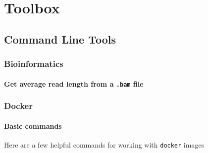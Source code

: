 \documentclass[]{book}
\newenvironment{Shaded}{\begin{snugshade}}{\end{snugshade}}
\newcommand{\ExtensionTok}[1]{#1}
\newcommand{\FunctionTok}[1]{\textcolor[rgb]{0.00,0.00,0.00}{#1}}
\newcommand{\KeywordTok}[1]{\textcolor[rgb]{0.13,0.29,0.53}{\textbf{#1}}}
\newcommand{\NormalTok}[1]{#1}
\newcommand{\StringTok}[1]{\textcolor[rgb]{0.31,0.60,0.02}{#1}}
\begin{document}
\hypertarget{toolbox}{%
\chapter{Toolbox}\label{toolbox}}

\hypertarget{command-line-tools}{%
\section{Command Line Tools}\label{command-line-tools}}

\hypertarget{bioinformatics}{%
\subsection{Bioinformatics}\label{bioinformatics}}

\hypertarget{get-average-read-length-from-a-.bam-file}{%
\subsubsection{\texorpdfstring{Get average read length from a \texttt{.bam} file}{Get average read length from a .bam file}}\label{get-average-read-length-from-a-.bam-file}}

\begin{Shaded}
\end{Shaded}

\hypertarget{docker}{%
\subsection{Docker}\label{docker}}

\hypertarget{basic-commands}{%
\subsubsection{Basic commands}\label{basic-commands}}

Here are a few helpful commands for working with \texttt{docker} images
\end{document}
